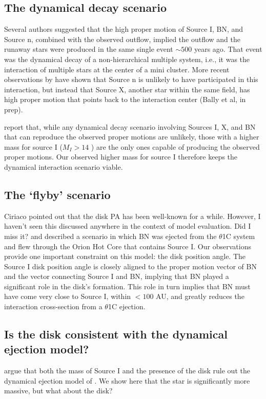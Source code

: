 \documentclass[twocolumn]{aastex61}
\begin{document}
\subsection{The dynamical decay scenario}
Several authors \citep[][]{Gomez2008a,Goddi2011b,Bally2011a} suggested that
the high proper
motion of Source I, BN, and Source n, combined with the observed \hh outflow,
implied the outflow and the runaway stars were produced in the same single
event $\sim500$ years ago.  That event was the dynamical decay of a
non-hierarchical multiple system, i.e., it was the interaction of multiple
stars at the center of a mini cluster.  More recent observations by
\citet{Luhman2017a} have shown that Source n is unlikely to have participated
in this interaction, but instead that Source X, another star within the same
field, has high proper motion that points back to the interaction center (Bally et al,
in prep).

\citet{Farias2017a} report that, while any dynamical decay scenario involving
Sources I, X, and BN that can reproduce the observed proper motions are
unlikely, those with a higher mass for source I ($M_I>14$ \msun) are the only
ones capable of producing the observed proper motions.  Our observed higher
mass for source I therefore keeps the dynamical interaction scenario viable.

\subsection{The `flyby' scenario}
{\color{red} Ciriaco pointed out that the disk PA has been well-known for a while.
However, I haven't seen this discussed anywhere in the context
of model evaluation.  Did I miss it?}
\citet{Tan2004a} and \citet{Chatterjee2012a} described a scenario in which BN
was ejected from the $\theta$1C system and flew through the Orion Hot Core that
contains Source I.   Our observations provide one important constraint on this model:
the disk position angle.
The Source I disk position angle is  closely aligned to the proper
motion vector of BN and the vector connecting Source I and BN,
implying that BN played a significant role in the disk's formation.
This role in turn implies that BN must have come very close to Source I,
within $<100$ AU, and greatly reduces the interaction cross-section
from a $\theta$1C ejection.


\subsection{Is the disk consistent with the dynamical ejection model?}
\citet{Plambeck2016a} argue that both the mass of Source I and the presence of
the disk rule out the dynamical ejection model of \citet{Bally2011a}.  We show
here that the star is significantly more massive, but what about the disk?
\end{document}
